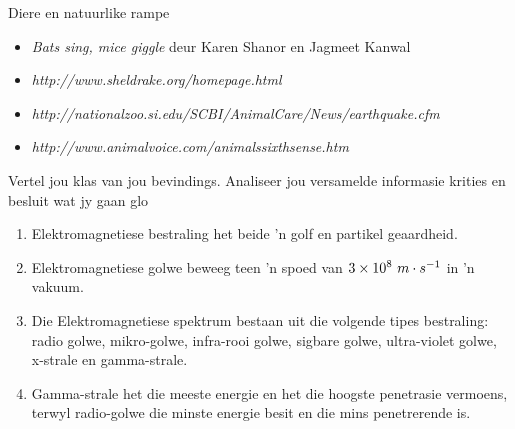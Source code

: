 \begin{project}{Diere en natuurlike rampe}
\begin{itemize}[noitemsep]
\item \textsl{Bats sing, mice giggle} deur Karen Shanor en Jagmeet Kanwal
\item \textsl{http://www.sheldrake.org/homepage.html}
\item \textsl{http://nationalzoo.si.edu/SCBI/AnimalCare/News/earthquake.cfm}
\item \textsl{http://www.animalvoice.com/animalssixthsense.htm}
\end{itemize}
        \label{m38779*id1164121076422} Vertel jou klas van jou bevindings. Analiseer jou versamelde informasie krities en besluit wat jy gaan glo\par 
      \label{m38779*cid9}
      \end{project}


            \nopagebreak
      \label{m38779*id189769}\begin{enumerate}[noitemsep, label=\textbf{\arabic*}. ] 
            \label{m38779*uid30}\item Elektromagnetiese bestraling het beide 'n golf en partikel geaardheid.
\label{m38779*uid31}\item Elektromagnetiese golwe beweeg teen 'n spoed van $3\ensuremath{\times}{10}^{8}\phantom{\rule{3.33333pt}{0ex}}m\ensuremath{\cdot}{s}^{-1}$ in 'n vakuum.
\label{m38779*uid32}\item Die Elektromagnetiese spektrum bestaan uit die volgende tipes bestraling: radio golwe, mikro-golwe, infra-rooi golwe, sigbare golwe, ultra-violet golwe, x-strale en gamma-strale. 
\label{m38779*uid33}\item Gamma-strale het die meeste energie en het die hoogste penetrasie vermoens, terwyl radio-golwe die minste energie besit en die mins penetrerende is. 
\end{enumerate}
